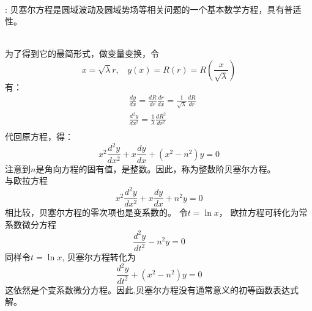 ~~\\

\begin{remark}:
贝塞尔方程是圆域波动及圆域势场等相关问题的一个基本数学方程，具有普适性。
\end{remark}
~~\\

为了得到它的最简形式，做变量变换，令
	\begin{equation*}
		x=\sqrt{\lambda} r, ~~~~y(x)= R(r) =R(\frac{x}{\sqrt{\lambda}})
	\end{equation*}
	有： 
	\[
	\begin{aligned}
		&\frac{dy}{dx} = \frac{dR}{dr} \frac{dr}{dx} = \frac{1}{ \sqrt{\lambda}} \frac{dR}{dr}\\
		&\frac{d^2y}{dx^2} = \frac{1}{\lambda} \frac{dR^2}{dr^2}\\
	\end{aligned}	
	\]
	代回原方程，得：
	\begin{equation} \label{eq:bessel}
		\boxed{x^2\frac{d^2y}{dx^2} + x\frac{dy}{dx} +(x^2 -n^2)y=0}
	\end{equation}
	注意到$n$是角向方程的固有值，是整数。因此，称为整数阶贝塞尔方程。\\ 
	与欧拉方程
	\begin{equation*}
		x^2\frac{d^2y}{dx^2} + x\frac{dy}{dx} +n^2y=0
	\end{equation*}
	相比较，贝塞尔方程的零次项也是变系数的。 令$t=\ln x $， 欧拉方程可转化为常系数微分方程
	\[ \frac{d^2y}{dt^2} - n^2y=0 \]	
	同样令$t=\ln x $, 贝塞尔方程转化为 
	\[ \frac{d^2y}{dt^2} +(x^2-n^2)y=0 \]
	这依然是个变系数微分方程。因此,贝塞尔方程没有通常意义的初等函数表达式解。

